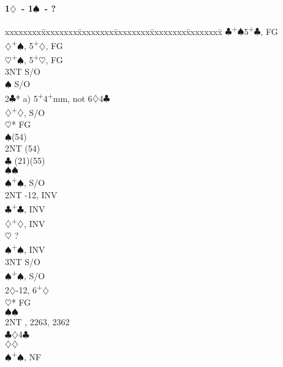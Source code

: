\documentclass[10pt]{article}
\renewcommand{\c}{$\clubsuit$}
\renewcommand{\d}{$\diamondsuit$}
\newcommand{\h}{$\heartsuit$}
\newcommand{\s}{$\spadesuit$}
\newcommand{\p}{\textsuperscript{+}}
\newenvironment{bidtable}[1][]
{\textbf{#1}
  \begin{adjustwidth}{1em}{}
    \addvspace{2pt}
    \begin{tabbing}
      xxxxxxxx\=xxxxxxxx\=xxxxxxxx\=xxxxxxxx\=xxxxxxxx\=xxxxxxxx\=\kill}
{\end{tabbing}\end{adjustwidth}\bigskip}%
\begin{document}
\begin{multicols*}{2}
\begin{bidtable}[1\d\ - 1\s\ - ?]
     \c  {}\p\s 5\p\c, FG                        \\
     \d  {}\p\s, 5\p\d, FG                       \\
     \h  {}\p\s, 5\p\h, FG                       \\
     \> 3NT  \> S/O                                    \\
     \s  \> S/O                                    \\
2\c* \> a) 5\p 4\p mm, not 6\d 4\c                     \\
     \d  {}\p\d, S/O                             \\
     \h* \> FG                                     \\
     \>      \s {}(54)                          \\
     \>      \> 2NT (54)                          \\
     \>      \c \> (21)(55)                        \\
     \>      \s {}\s                             \\
     \s  {}\p\s, S/O                             \\
     \> 2NT  -12, INV                              \\
     \c  {}\p\c, INV                             \\
     \d  {}\p\d, INV                             \\
     \h  \> ?                                      \\
     \s  {}\p\s, INV                             \\
     \> 3NT  \> S/O                                    \\
     \s  {}\p\s, S/O                             \\
2\d  {}-12, 6\p\d                                   \\
     \h* \> FG                                     \\
     \>      \s {}\s                             \\
     \>      \> 2NT , 2263, 2362                \\
     \>      \c {}\d 4\c                         \\
     \>      \d {}\d                             \\
     \s  {}\p\s, NF                              \\

\end{bidtable}
\end{multicols*}
\end{document}
